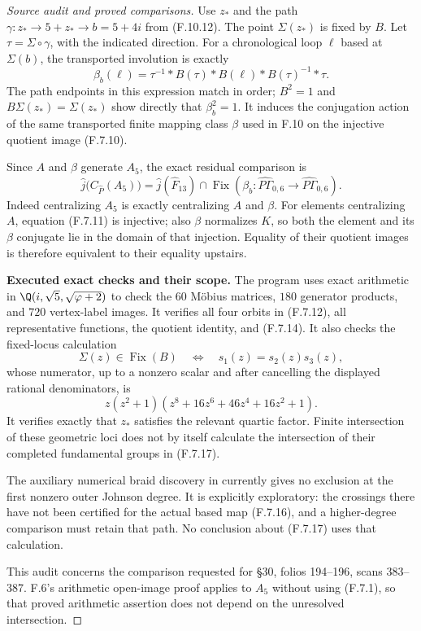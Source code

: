 \begin{proof}[Source audit and proved comparisons]
Use $z_*$ and the path
$\gamma:z_*\to5+z_*\to b=5+4i$ from (F.10.12).
The point $\Sigma(z_*)$ is fixed by $B$.  Let
$\tau=\Sigma\circ\gamma$, with the indicated direction.
For a chronological loop $\ell$ based at $\Sigma(b)$, the
transported involution is exactly
\[
 \beta_b(\ell)=
 \tau^{-1}*B(\tau)*B(\ell)*B(\tau)^{-1}*\tau.          \tag{F.7.16}
\]
The path endpoints in this expression match in order;
$B^2=1$ and $B\Sigma(z_*)=\Sigma(z_*)$ show directly that
$\beta_b^2=1$.  It induces the conjugation action of the
same transported finite mapping class $\beta$ used in F.10
on the injective quotient image (F.7.10).

Since $A$ and $\beta$ generate $A_5$, the exact residual
comparison is
\[
 \widehat j\bigl(C_{\widehat P}(A_5)\bigr)
   =\widehat j(\widehat F_{13})\cap
       \operatorname{Fix}\!\left(
          \beta_b:\widehat{P\Gamma}_{0,6}
                    \longrightarrow\widehat{P\Gamma}_{0,6}
                          \right).                    \tag{F.7.17}
\]
Indeed centralizing $A_5$ is exactly centralizing $A$ and
$\beta$.  For elements centralizing $A$, equation (F.7.11)
is injective; also $\beta$ normalizes $K$, so both the
element and its $\beta$ conjugate lie in the domain of
that injection.  Equality of their quotient images is
therefore equivalent to their equality upstairs.

\medskip\noindent\textbf{Executed exact checks and their scope.}
The program 
uses exact arithmetic in $\Q(i,\sqrt5,\sqrt{\varphi+2})$
to check the $60$ M\"obius matrices, $180$ generator
products, and $720$ vertex-label images.  It verifies all
four orbits in (F.7.12), all representative functions,
the quotient identity, and (F.7.14).  It also checks
the fixed-locus calculation
\[
 \Sigma(z)\in\operatorname{Fix}(B)
 \quad\Longleftrightarrow\quad s_1(z)=s_2(z)s_3(z),
\]
whose numerator, up to a nonzero scalar and after
cancelling the displayed rational denominators, is
\[
 z(z^2+1)(z^8+16z^6+46z^4+16z^2+1).                    \tag{F.7.18}
\]
It verifies exactly that $z_*$ satisfies the relevant
quartic factor.  Finite intersection of these geometric
loci does not by itself calculate the intersection of
their completed fundamental groups in (F.7.17).

The auxiliary numerical braid discovery in
 currently gives
no exclusion at the first nonzero outer Johnson degree.
It is explicitly exploratory: the crossings there have
not been certified for the actual based map (F.7.16),
and a higher-degree comparison must retain that path.
No conclusion about (F.7.17) uses that calculation.

This audit concerns the comparison requested for
\S30, folios 194--196, scans 383--387. F.6's
arithmetic open-image proof applies to $A_5$ without
using (F.7.1), so that proved arithmetic assertion
does not depend on the unresolved intersection.
\end{proof}
